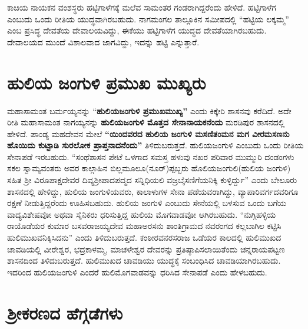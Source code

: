 ಕಾಚಿಯ ನಾಯಕನ ವಂಶಸ್ಥರು ಹಟ್ಟಿಗಾಳೆಗಕ್ಕೆ ಮಲೆವ ಸಾಮಂತರ ಗಂಡರಾಗಿದ್ದರೆಂದು ಹೇಳಿದೆ. ಹಟ್ಟಿಗಾಳೆಗ ಎಂಬುದು ಒಂದು ರೀತಿಯ ಯುದ್ಧವಾಗಿರಬಹುದು. ನಾಗಮಂಗಲ ತಾಲ್ಲೂಕಿನ ಸಮೀಪದಲ್ಲಿ “ಹಟ್ಟಿಯ ಲಕ್ಕಮ್ಮ” ಎಂಬ ಪ್ರಸಿದ್ಧ ದೇವತೆಯ ದೇವಾಲಯವಿದ್ದು, ಈಕೆಯು ಹಟ್ಟಿಗಾಳೆಗ ಯುದ್ಧದ ದೇವತೆಯಾಗಿರಬಹುದು. ದೇವಾಲಯದ ಮುಂದೆ ವಿಶಾಲವಾದ ಜಾಗವಿದ್ದು, ಇದನ್ನು ಹಟ್ಟಿ ಎನ್ನುತ್ತಾರೆ.


\section*{ಹುಲಿಯ ಜಂಗುಳಿ ಪ್ರಮುಖ ಮುಖ್ಯರು}

ಮಹಾಸಾಮಂತ ಬರ್ಮಯ್ಯನನ್ನು “\textbf{ಹುಲಿಯಜಂಗುಳಿ ಪ್ರಮುಖಮುಖ್ಯ”} ಎಂದು ಕಿಕ್ಕೇರಿ ಶಾಸನವು ಕರೆದಿದೆ. ಅದೇ ರೀತಿ ಮಹಾಸಾಮಂತ ನಾಗಯ್ಯನನ್ನು \textbf{ಹುಲಿಯಜಂಗುಳಿ ಮೊತ್ತದ ಸೇನಾನಾಯಕನೆಂದು} ಮರಡಿಪುರ ಶಾಸನದಲ್ಲಿ ಹೇಳಿದೆ. ಪಾಂಡ್ಯ ಮಹದೇವನ ಮೇಲೆ \textbf{“ಯಿಂದವರದ ಹುಲಿಯ ಜಂಗುಳಿ ಮಸಣಿತಂಮನ ಮಗ ವೀರಮಸಣನು ಹೊಯಿದು ಕುಟ್ಟಾಡಿ ಸುರಲೋಕ ಪ್ರಾಪ್ತನಾದನೆಂದು”} ತಿಳಿದುಬರುತ್ತದೆ. ಹುಲಿಯಜಂಗುಳಿ ಎಂಬುದು ಒಂದು ರೀತಿಯ ಸೇನಾಪಡೆ ಇರಬಹುದು. “ಸಂಥೆಶಾಸನ ಪೇಟೆ ಒಳಗಾದ ಸಮಸ್ತ ಹಳುವು ನಖರ ಪರಿವಾರ ಮುಮ್ಮುರಿ ದಂಡಂಗಳು ಸಕಲ ಸ್ವಾಮ್ಯವಂತರು ಅವರ ಕಾಲ್ಗಾಹಿನ ಬಿಲ್ಲಮೂಲೂ(ನೂರ್)ಪ್ಪಬ್ಬರು ಹೊಲಿಯಜಂಗುಲಿ(ಹುಲಿಯ ಜಂಗುಳಿ) ಸಹಿತ ಶ‍್ರೀ ವಿರೂಪಾಕ್ಷದೇವರ ದಿವ್ಯ\-ಶ‍್ರೀಪಾದಪದ್ಮದ ಸನ್ನಿಧಿಯಲಿ ವಜ್ರಬೈಸಣಿಗೆಯನಿಕ್ಕಿ ಕುಳ್ಳಿರ್ದ್ದು” ಎಂದು ಬೇಲೂರು ಶಾಸನದಲ್ಲಿ ಹೇಳಿದ್ದು, ಹುಲಿಯ ಜಂಗುಳಿಯವರು, ಕಾಲಾಳುಗಳ ಸೇನಾ ಪಡೆಯವರಾಗಿದ್ದು, ವ್ಯಾಪಾರಿವರ್ಗದವರಿಗೂ ರಕ್ಷಣೆ ನೀಡುತ್ತಿದ್ದರೆಂದು ಊಹಿಸ\-ಬಹುದು. ಹುಲಿಯ ಜಂಗುಳಿ ಎಂಬುದು ಸೇನೆಯಲ್ಲಿ ಬಳಸುವ ಒಂದು ಬಗೆಯ ವಾದ್ಯವಿಶೇಷವೋ ಅಥವಾ ಸೈನಿಕರು ಧರಿಸುತ್ತಿದ್ದ ಹುಲಿಯ ಮೊಗವಾಡವೋ ಆಗಿರಬಹುದು. “ನುಗ್ಗಿಹಳ್ಳಿಯ ರಾಯೊಡೆಯರ ಕುಮಾರ ಬಸವರಾಜಯ್ಯದೇವ ಮಹಾಅರಸನು ಶಾಂತಿಗ್ರಾಮದ ನವರಂಗದ ಕಲ್ಲಬಾಗಿಲ ಕಟ್ಟಿಸಿ ಹುಲಿಮುಖವನಿಕ್ಕಿಸಿದನು” ಎಂದು ತಿಳಿದುಬರುತ್ತದೆ. ಕಂಠೀರವನರಸರಾಜ ಒಡೆಯರ ಕಾಲದಲ್ಲಿ ಹುಲಿಮುಖದ ಚಾವಡಿಯಲ್ಲಿ ವೀರೇಶ್ವರ, ಭದ್ರಕಾಳಮ್ಮ, ಮಾಚಳೇಶ್ವರ ದೇವರನ್ನು ಪ್ರತಿಷ್ಠಾಪಿಸಲಾಯಿತೆಂದು ಚನ್ನರಾಯಪಟ್ಟಣ ಶಾಸನದಿಂದ ತಿಳಿದುಬರುತ್ತದೆ. ಹುಲಿಮುಖದ ಚಾವಡಿಯು ಯುದ್ಧಕ್ಕೆ ಸಂಬಂಧಿಸಿದ ಚಾವಡಿಯಾಗಿರ\-ಬಹುದು. ಇದರಿಂದ ಹುಲಿಯಜಂಗುಳಿ ಎಂದರೆ ಹುಲಿಮೊಗವಾಡವನ್ನು ಧರಿಸಿದ ಸೇನಾಪಡೆ ಎಂದು ಹೇಳಬಹುದು.


\section*{ಶ‍್ರೀಕರಣದ ಹೆಗ್ಗಡೆಗಳು}

